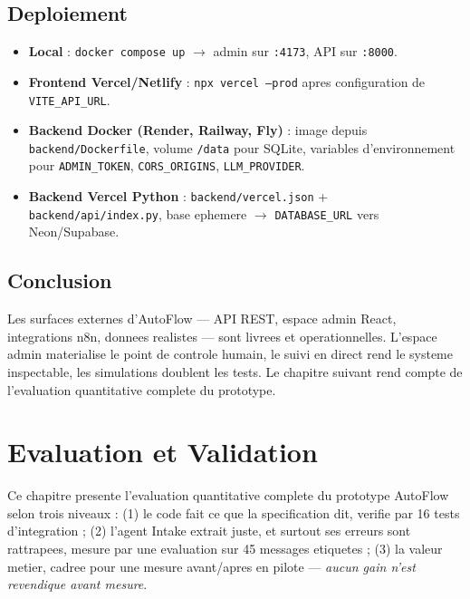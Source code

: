 \documentclass[12pt,a4paper,openany]{report}
\begin{document}
\section{Deploiement}

\begin{itemize}[leftmargin=1.5cm]
\item \textbf{Local} : \texttt{docker compose up} $\rightarrow$ admin sur \texttt{:4173}, API sur \texttt{:8000}.
\item \textbf{Frontend Vercel/Netlify} : \texttt{npx vercel --prod} apres configuration de \texttt{VITE\_API\_URL}.
\item \textbf{Backend Docker (Render, Railway, Fly)} : image depuis \texttt{backend/Dockerfile}, volume \texttt{/data} pour SQLite, variables d'environnement pour \texttt{ADMIN\_TOKEN}, \texttt{CORS\_ORIGINS}, \texttt{LLM\_PROVIDER}.
\item \textbf{Backend Vercel Python} : \texttt{backend/vercel.json} + \texttt{backend/api/index.py}, base ephemere $\rightarrow$ \texttt{DATABASE\_URL} vers Neon/Supabase.
\end{itemize}

\section{Conclusion}

Les surfaces externes d'AutoFlow --- API REST, espace admin React, integrations n8n, donnees realistes --- sont livrees et operationnelles. L'espace admin materialise le point de controle humain, le suivi en direct rend le systeme inspectable, les simulations doublent les tests. Le chapitre suivant rend compte de l'evaluation quantitative complete du prototype.

\chapter{Evaluation et Validation}\label{chap:evaluation}
Ce chapitre presente l'evaluation quantitative complete du prototype AutoFlow selon trois niveaux : (1) le code fait ce que la specification dit, verifie par 16 tests d'integration ; (2) l'agent Intake extrait juste, et surtout ses erreurs sont rattrapees, mesure par une evaluation sur 45 messages etiquetes ; (3) la valeur metier, cadree pour une mesure avant/apres en pilote --- \emph{aucun gain n'est revendique avant mesure}.
\end{document}
